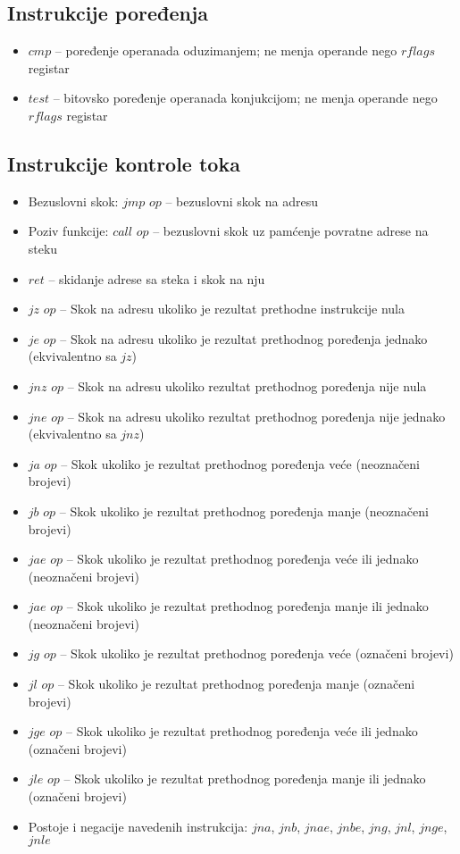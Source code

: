 \documentclass[a4paper, 10pt]{article}
\begin{document}
	\subsection{Instrukcije poređenja}
	\begin{itemize}
		\item $cmp$ -- poređenje operanada oduzimanjem; ne menja operande nego $rflags$ registar
		\item $test$ -- bitovsko poređenje operanada konjukcijom; ne menja operande nego $rflags$ registar
	\end{itemize}
	\subsection{Instrukcije kontrole toka}
	\begin{itemize}
		\item Bezuslovni skok: $jmp$ $op$ -- bezuslovni skok na adresu
		\item Poziv funkcije: $call$ $op$ -- bezuslovni skok uz pamćenje povratne adrese na steku
		\item $ret$ -- skidanje adrese sa steka i skok na nju
		\item $jz$ $op$ -- Skok na adresu ukoliko je rezultat prethodne instrukcije nula
		\item $je$ $op$ -- Skok na adresu ukoliko je rezultat prethodnog poređenja jednako (ekvivalentno sa $jz$)
		\item $jnz$ $op$ -- Skok na adresu ukoliko rezultat prethodnog poređenja nije nula
		\item $jne$ $op$ -- Skok na adresu ukoliko rezultat prethodnog poređenja nije jednako (ekvivalentno sa $jnz$)
		\item $ja$ $op$ -- Skok ukoliko je rezultat prethodnog poređenja veće (neoznačeni brojevi)
		\item $jb$ $op$ -- Skok ukoliko je rezultat prethodnog poređenja manje (neoznačeni brojevi)
		\item $jae$ $op$ -- Skok ukoliko je rezultat prethodnog poređenja veće ili jednako (neoznačeni brojevi)
		\item $jae$ $op$ -- Skok ukoliko je rezultat prethodnog poređenja manje ili jednako (neoznačeni brojevi)
		\item $jg$ $op$ -- Skok ukoliko je rezultat prethodnog poređenja veće (označeni brojevi)
		\item $jl$ $op$ -- Skok ukoliko je rezultat prethodnog poređenja manje (označeni brojevi)
		\item $jge$ $op$ -- Skok ukoliko je rezultat prethodnog poređenja veće ili jednako (označeni brojevi)
		\item $jle$ $op$ -- Skok ukoliko je rezultat prethodnog poređenja manje ili jednako (označeni brojevi)
		\item Postoje i negacije navedenih instrukcija: $jna$, $jnb$, $jnae$, $jnbe$, $jng$, $jnl$, $jnge$, $jnle$
	\end{itemize}
	
\end{document}
